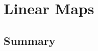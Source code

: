 \documentclass[11pt,notitlepage,oneside]{article}
\begin{document}
\newpage
\section{Linear Maps}
\subsection*{Summary}

\newpage
{}
\small


\end{document}
